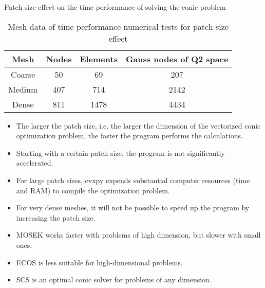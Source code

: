 \documentclass[9pt]{beamer}
\begin{document}
\begin{frame}{Patch size effect on the time performance of solving the conic problem}
  \begin{table}[H]
    \centering
    \begin{tabular}{|cccc|}
      \hline
      Mesh & Nodes & Elements & Gauss nodes of Q2 space \\
      \hline
      Coarse & 50	& 69 & 207 \\
      Medium & 407 & 714 & 2142 \\
      Dense & 811	& 1478 & 4434 \\
      \hline
    \end{tabular}
    \caption{Mesh data of time performance numerical tests for patch size effect}
    \label{tab:cvxpy_tests}
  \end{table}

  \begin{itemize}
    \item The larger the patch size, i.e. the larger the dimension of the vectorized conic optimization problem, the faster the program performs the calculations.
    \item Starting with a certain patch size, the program is not significantly accelerated.
    \item For large patch sizes, cvxpy expends substantial computer resources (time and RAM) to compile the optimization problem.
    \item For very dense meshes, it will not be possible to speed up the program by increasing the patch size.
    \item MOSEK works faster with problems of high dimension, but slower with small ones.
    \item ECOS is less suitable for high-dimensional problems.
    \item SCS is an optimal conic solver for problems of any dimension.
\end{itemize}
\end{frame}


\end{document}
